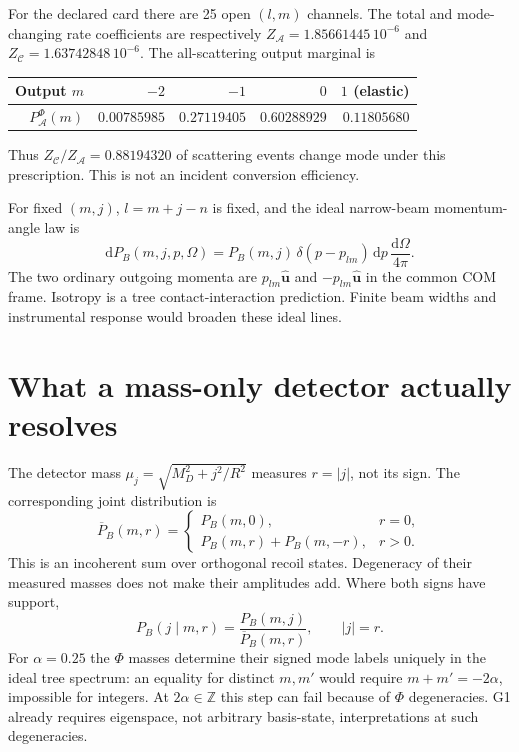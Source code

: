 \documentclass[11pt,a4paper]{article}
\newcommand{\dd}{\mathrm d}
\newcommand{\cA}{\mathcal A}
\newcommand{\cC}{\mathcal C}
\begin{document}
For the declared card there are 25 open $(l,m)$ channels.
The total and mode-changing rate coefficients are respectively
$Z_{\cA}=1.85661445\,10^{-6}$ and $Z_{\cC}=1.63742848\,10^{-6}$.
The all-scattering output marginal is
\begin{center}
\begin{tabular}{rrrrr}
\toprule
Output $m$ & $-2$ & $-1$ & $0$ & $1$ (elastic)\\
\midrule
$P_{\cA}^{\Phi}(m)$ & $0.00785985$ & $0.27119405$ & $0.60288929$ & $0.11805680$\\
\bottomrule
\end{tabular}
\end{center}
Thus $Z_{\cC}/Z_{\cA}=0.88194320$ of scattering events change
mode under this prescription. This is not an incident conversion efficiency.

For fixed $(m,j)$, $l=m+j-n$ is fixed, and the ideal narrow-beam
momentum-angle law is
\begin{equation}\label{eq:lines}
 \dd P_B(m,j,p,\Omega)
 =P_B(m,j)\,\delta(p-p_{lm})\,\dd p\,\frac{\dd\Omega}{4\pi}.
\end{equation}
The two ordinary outgoing momenta are $p_{lm}\widehat{\boldsymbol u}$
and $-p_{lm}\widehat{\boldsymbol u}$ in the common COM frame.
Isotropy is a tree contact-interaction prediction. Finite beam
widths and instrumental response would broaden these ideal lines.

\section{What a mass-only detector actually resolves}
The detector mass $\mu_j=\sqrt{M_D^2+j^2/R^2}$ measures
$r=|j|$, not its sign. The corresponding joint distribution is
\begin{equation}
 \overline P_B(m,r)=
 \begin{cases}
 P_B(m,0),&r=0,\\
 P_B(m,r)+P_B(m,-r),&r>0 .
 \end{cases}
\end{equation}
This is an incoherent sum over orthogonal recoil states. Degeneracy
of their measured masses does not make their amplitudes add.
Where both signs have support,
\begin{equation}
 P_B(j\mid m,r)=\frac{P_B(m,j)}{\overline P_B(m,r)},\qquad |j|=r .
\end{equation}
For $\alpha=0.25$ the $\Phi$ masses determine their signed mode
labels uniquely in the ideal tree spectrum: an equality for distinct
$m,m'$ would require $m+m'=-2\alpha$, impossible for integers.
At $2\alpha\in\mathbb Z$ this step can fail because of $\Phi$
degeneracies. G1 already requires eigenspace, not arbitrary basis-state,
interpretations at such degeneracies.
\end{document}
